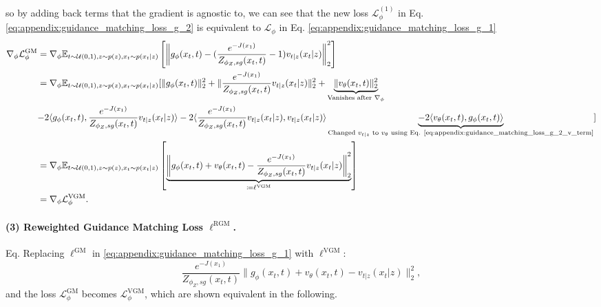 so by adding back terms that the gradient is agnostic to, we can see that the new loss  $\mathcal{L}_{\phi}^{(1)}$ in Eq. \eqref{eq:appendix:guidance_matching_loss_g_2} is equivalent to $\mathcal{L}_{\phi}$ in Eq. \eqref{eq:appendix:guidance_matching_loss_g_1}
\begin{align}
    \nonumber\nabla_{\phi}{\mathcal{L}}_{\phi}^{\text{GM}} & = \nabla_{\phi}\mathbb{E}_{t\sim\mathcal{U}(0,1),z\sim p(z),x_t \sim p(x_t|z)}\left[\left\|g_{\phi}(x_t,t) - (\frac{e^{-J(x_1)}}{Z_{\phi_Z,sg}(x_t,t)} - 1) v_{t|z}(x_t|z)\right\|_2^2\right] \\
    \nonumber& = \nabla_{\phi}\mathbb{E}_{t\sim\mathcal{U}(0,1),z\sim p(z),x_t \sim p(x_t|z)}[\|{g_{\phi}(x_t,t)\|_2^2} + \|\frac{e^{-J(x_1)}}{Z_{\phi_Z,sg}(x_t,t)}v_{t|z}(x_t|z)\|_2^2 + \underbrace{\|v_{\theta}(x_t,t)\|_2^2}_{\text{Vanishes after $\nabla_\phi$}} \\
    & {-2\langle g_{\phi}(x_t,t), \frac{e^{-J(x_1)}}{Z_{\phi_Z,sg}(x_t,t)}v_{t|z}(x_t|z)\rangle} - 2\langle\frac{e^{-J(x_1)}}{Z_{\phi_Z,sg}(x_t,t)}v_{t|z}(x_t|z), v_{t|z}(x_t|z)\rangle \underbrace{- 2\langle v_\theta(x_t,t), g_{\phi}(x_t,t)\rangle}_{\text{Changed $v_{t|z}$ to $v_\theta$ using Eq. \eqref{eq:appendix:guidance_matching_loss_g_2_v_term}}} ]\\
    \nonumber& =\nabla_{\phi} \mathbb{E}_{t\sim\mathcal{U}(0,1),z\sim p(z),x_t \sim p(x_t|z)}\left[\underbrace{\left\|g_{\phi}(x_t,t) + v_\theta(x_t,t) - \frac{e^{-J(x_1)}}{Z_{\phi_Z,sg}(x_t,t)}v_{t|z}(x_t|z)\right\|_2^2}_{\coloneqq\ell^{\text{VGM}}}\right]\\
    & = \nabla_{\phi} {\mathcal{L}}_{\phi}^{\text{VGM}}.
\end{align}


\paragraph{(3) Reweighted Guidance Matching Loss $\ell^{\text{RGM}}$.} Eq. Replacing $\ell^{\text{GM}}$ in \eqref{eq:appendix:guidance_matching_loss_g_1} with $\ell^{\text{VGM}}$: 
\begin{equation}\label{eq:appendix:guidance_matching_loss_g_3_loss}
    \frac{e^{-J(x_1)}}{Z_{\phi_Z,sg}(x_t,t)} \|g_{\phi}(x_t,t) + v_\theta(x_t,t) - v_{t|z}(x_t|z)\|_2^2,
\end{equation}
and the loss $\mathcal{L}^{\text{GM}}_\phi$ becomes $\mathcal{L}^{\text{VGM}}_\phi$, which are shown equivalent in the following.

